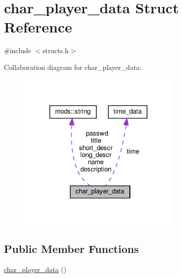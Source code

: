 \hypertarget{structchar__player__data}{}\section{char\+\_\+player\+\_\+data Struct Reference}
\label{structchar__player__data}


{\ttfamily \#include $<$structs.\+h$>$}



Collaboration diagram for char\+\_\+player\+\_\+data\+:
\nopagebreak
\begin{figure}[H]
\begin{center}
\leavevmode
\includegraphics[width=228pt]{structchar__player__data__coll__graph}
\end{center}
\end{figure}
\subsection*{Public Member Functions}
\begin{DoxyCompactItemize}
\item 
\hyperlink{structchar__player__data_af63d02e377ae646aaf4f7eaa13de601c}{char\+\_\+player\+\_\+data} ()
\end{DoxyCompactItemize}
